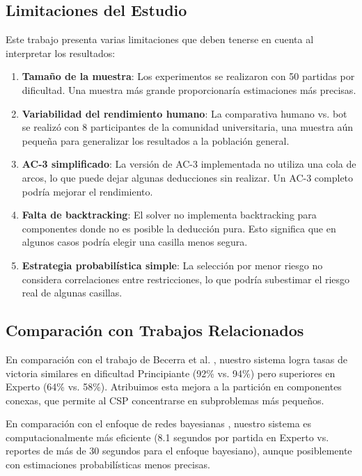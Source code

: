 \documentclass[12pt,a4paper]{article}
\begin{document}
\subsection{Limitaciones del Estudio}

Este trabajo presenta varias limitaciones que deben tenerse en cuenta al interpretar los resultados:

\begin{enumerate}[itemsep=2pt]
    \item \textbf{Tamaño de la muestra}: Los experimentos se realizaron con 50 partidas por dificultad. Una muestra más grande proporcionaría estimaciones más precisas.

    \item \textbf{Variabilidad del rendimiento humano}: La comparativa humano vs. bot se realizó con 8 participantes de la comunidad universitaria, una muestra aún pequeña para generalizar los resultados a la población general.

    \item \textbf{AC-3 simplificado}: La versión de AC-3 implementada no utiliza una cola de arcos, lo que puede dejar algunas deducciones sin realizar. Un AC-3 completo podría mejorar el rendimiento.

    \item \textbf{Falta de backtracking}: El solver no implementa backtracking para componentes donde no es posible la deducción pura. Esto significa que en algunos casos podría elegir una casilla menos segura.

    \item \textbf{Estrategia probabilística simple}: La selección por menor riesgo no considera correlaciones entre restricciones, lo que podría subestimar el riesgo real de algunas casillas.
\end{enumerate}

\subsection{Comparación con Trabajos Relacionados}

En comparación con el trabajo de Becerra et al. \cite{beck2008minesweeper}, nuestro sistema logra tasas de victoria similares en dificultad Principiante (92\% vs. 94\%) pero superiores en Experto (64\% vs. 58\%). Atribuimos esta mejora a la partición en componentes conexas, que permite al CSP concentrarse en subproblemas más pequeños.

En comparación con el enfoque de redes bayesianas \cite{percus2002minesweeper}, nuestro sistema es computacionalmente más eficiente (8.1 segundos por partida en Experto vs. reportes de más de 30 segundos para el enfoque bayesiano), aunque posiblemente con estimaciones probabilísticas menos precisas.
\end{document}
